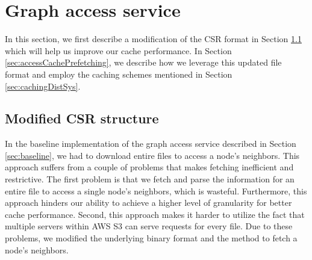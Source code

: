 \section{Graph access service}\label{sec:graphAccess}
In this section, we first describe a modification of the CSR format in
Section \ref{sec:modifiedCsr} which will help us improve our cache performance.
In Section \ref{sec:accessCachePrefetching}, we describe how we leverage
this updated file format and employ the caching schemes mentioned in
Section \ref{sec:cachingDistSys}.

\subsection{Modified CSR structure}\label{sec:modifiedCsr}
In the baseline implementation of the graph access service described in
Section \ref{sec:baseline}, we had to download entire files to access
a node's neighbors. This approach suffers from a couple of problems that makes
fetching inefficient and restrictive. The first problem is that we
fetch and parse the information for an entire file to access a single
node's neighbors, which is wasteful. Furthermore, this approach hinders our
ability to achieve a higher level of granularity for better cache performance.
Second, this approach makes it harder to utilize the fact that multiple servers
within AWS S3 can serve requests for every file. Due to these problems, we modified the
underlying binary format and the method to fetch a node's neighbors.


